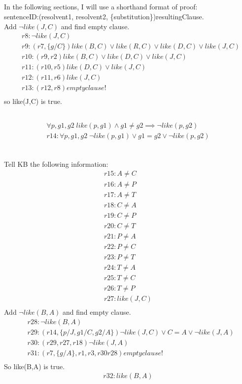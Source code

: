 \documentclass[12pt]{article}
\begin{document}
\subsection{}
In the following sections, I will use a shorthand format of proof: \\
sentenceID:(resolvent1, resolvent2, \{substitution\})resultingClause. \\
Add $\neg like(J,C)$ and find empty clause.
\begin{align*}
  &r8: \neg like(J,C) \\
  &r9: (r7,\{g/C\}) like(B,C) \lor like(R,C) \lor like(D,C) \lor like(J,C) \\
  &r10: (r9,r2) like(B,C) \lor like(D,C) \lor like(J,C) \\
  &r11: (r10,r5) like(D,C) \lor like(J,C) \\
  &r12: (r11,r6) like(J,C) \\
  &r13: (r12,r8) empty clause! \\
\end{align*}
so like(J,C) is true.
\subsection{}
\begin{align*}
  \forall p,g1,g2 \; like(p,g1) \land g1 \neq g2 \implies \neg like(p,g2) \\
  r14: \forall p,g1,g2 \; \neg like(p,g1) \lor g1 = g2 \lor \neg like(p,g2) \\
\end{align*}
\subsection{}
Tell KB the following information:
\begin{align*}
  r15: A \neq C \\
  r16: A \neq P \\
  r17: A \neq T \\
  r18: C \neq A \\
  r19: C \neq P \\
  r20: C \neq T \\
  r21: P \neq A \\
  r22: P \neq C \\
  r23: P \neq T \\
  r24: T \neq A \\
  r25: T \neq C \\
  r26: T \neq P \\
  r27: like(J,C) \\
\end{align*}
Add $ \neg like(B,A)$ and find empty clause.
\begin{align*}
  &r28: \neg like(B,A) \\
  &r29: (r14,\{p/J, g1/C, g2/A\}) \neg like(J,C) \lor C = A \lor \neg like(J,A) \\
  &r30: (r29, r27, r18) \neg like(J,A) \\
  &r31: (r7, \{g/A\}, r1, r3, r30 r28) empty clause! \\
\end{align*}
So like(B,A) is true.
\begin{align*}
  r32: like(B,A) \\
\end{align*}
\end{document}

